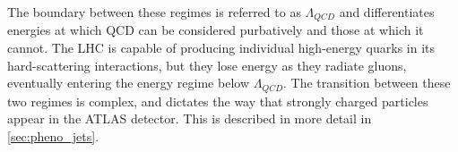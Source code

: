 The boundary between these regimes is referred to as $\Lambda_{QCD}$ and differentiates energies at which \ac{QCD} can be considered purbatively and those at which it cannot. The \ac{LHC} is capable of producing individual high-energy quarks in its hard-scattering interactions, but they lose energy as they radiate gluons, eventually entering the energy regime below $\Lambda_{QCD}$. The transition between these two regimes is complex, and dictates the way that strongly charged particles appear in the \ac{ATLAS} detector. This is described in more detail in \autoref{sec:pheno_jets}.










